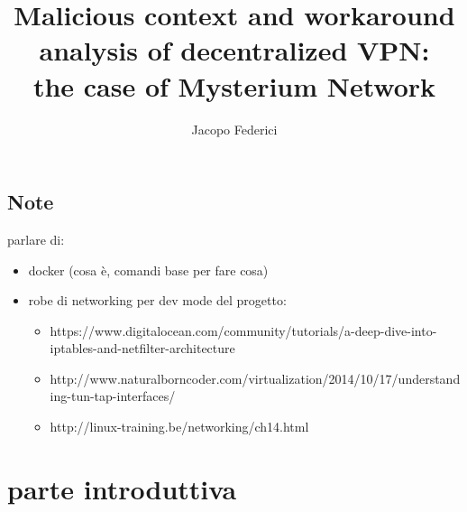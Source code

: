 \documentclass[]{article}
\title{Malicious context and workaround analysis of decentralized VPN:\\the case of Mysterium Network}
\author{Jacopo Federici}
\begin{document}
	\maketitle	
	\clearpage
	
	\tableofcontents{}

	\subsection{Note}
	parlare di:
	\begin{itemize}
		\item docker (cosa è, comandi base per fare cosa)
		\item robe di networking per dev mode del progetto:
		\begin{itemize}
			\item https://www.digitalocean.com/community/tutorials/a-deep-dive-into-iptables-and-netfilter-architecture
			\item http://www.naturalborncoder.com/virtualization/2014/10/17/understanding-tun-tap-interfaces/
			\item http://linux-training.be/networking/ch14.html
		\end{itemize}
	\end{itemize}

	\section{parte introduttiva}
	
\end{document}
